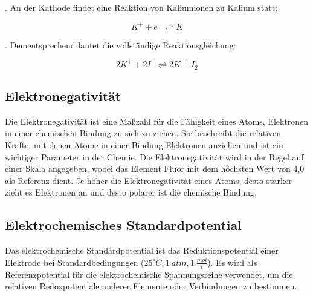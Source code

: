 \documentclass[11pt]{article}
\begin{document}
. An der Kathode findet eine Reaktion von Kaliumionen zu Kalium statt:
\begin{center}
    \begin{equation}
        K^{+} + e^{-} \rightleftharpoons K
    \end{equation}
\end{center}

. Dementsprechend lautet die vollständige Reaktionsgleichung:
\begin{center}
    \begin{equation}
        2 K^{+} + 2 I^{-} \rightleftharpoons 2 K + I_{2}
    \end{equation}
\end{center}

\subsection{Elektronegativität}
Die Elektronegativität ist eine Maßzahl für die Fähigkeit eines Atoms, Elektronen in einer chemischen Bindung zu sich zu ziehen. Sie beschreibt die relativen Kräfte, mit denen Atome in einer Bindung Elektronen anziehen und ist ein wichtiger Parameter in der Chemie. Die Elektronegativität wird in der Regel auf einer Skala angegeben, wobei das Element Fluor mit dem höchsten Wert von 4,0 als Referenz dient. Je höher die Elektronegativität eines Atoms, desto stärker zieht es Elektronen an und desto polarer ist die chemische Bindung.

\subsection{Elektrochemisches Standardpotential}
Das elektrochemische Standardpotential ist das Reduktionspotential einer Elektrode bei Standardbedingungen ($25^{\circ}C, 1 \:atm, 1 \:\frac{mol}{l}$). Es wird als Referenzpotential für die elektrochemische Spannungsreihe verwendet, um die relativen Redoxpotentiale anderer Elemente oder Verbindungen zu bestimmen.
\end{document}
